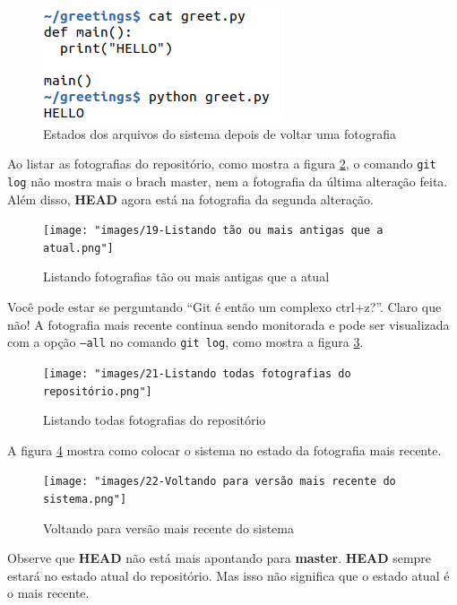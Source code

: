 \documentclass[a4paper]{book}
\begin{document}
\begin{figure}[ht]
\caption{Estados dos arquivos do sistema depois de voltar uma fotografia}
\label{fig:20}
\centering
\includegraphics[scale=0.6]{"images/20-Estados dos arquivos do sistema depois de voltar uma fotografia.png"}
\end{figure}

Ao listar as fotografias do repositório, como mostra a figura 
\ref{fig:19}, o comando \texttt{git log} não mostra mais o brach master, nem a fotografia da última alteração feita.
Além disso, \textbf{HEAD} agora está na fotografia da segunda 
alteração.

\begin{figure}[ht]
\caption{Listando fotografias tão ou mais antigas que a atual}
\label{fig:19}
\centering
\texttt{[image: "images/19-Listando tão ou mais antigas que a atual.png"]}
\end{figure}

Você pode estar se perguntando ``Git é então um complexo ctrl+z?''. Claro que não!
A fotografia mais recente continua sendo monitorada e 
pode ser visualizada com a opção \texttt{--all}
no comando \texttt{git log}, como mostra a 
figura \ref{fig:21}.

\begin{figure}[h!]
\caption{Listando todas fotografias do repositório}
\label{fig:21}
\centering
\texttt{[image: "images/21-Listando todas fotografias do repositório.png"]}
\end{figure}


A figura \ref{fig:22} mostra como colocar o sistema no
estado da fotografia mais recente.

\begin{figure}[ht]
\caption{Voltando para versão mais recente do sistema}
\label{fig:22}
\centering
\texttt{[image: "images/22-Voltando para versão mais recente do sistema.png"]}
\end{figure}

Observe que \textbf{HEAD} não está mais apontando para 
\textbf{master}. \textbf{HEAD} sempre estará no estado 
atual do repositório. Mas isso não significa que o estado 
atual é o mais recente.
\end{document}
